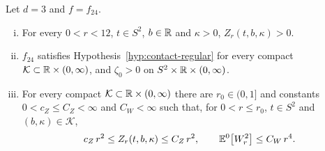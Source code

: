 \begin{lemma}\label{lem:contact-normalizer}
Let $d=3$ and $f=f_{24}$.
\begin{enumerate}[(i)]
\item For every $0<r<12$, $t\in S^2$, $b\in\mathbb R$ and $\kappa>0$, $Z_r(t,b,\kappa)>0$.
\item $f_{24}$ satisfies Hypothesis~\ref{hyp:contact-regular} for every compact $\mathcal K\subset\mathbb R\times(0,\infty)$, and $\zeta_0>0$ on $S^2\times\mathbb R\times(0,\infty)$.
\item For every compact $\mathcal K\subset\mathbb R\times(0,\infty)$ there are $r_0\in(0,1]$ and constants $0<c_Z\le C_Z<\infty$ and $C_W<\infty$ such that, for $0<r\le r_0$, $t\in S^2$ and $(b,\kappa)\in\mathcal K$,
\begin{equation}\label{eq:contact-normalizer}
c_Z\,r^2\le Z_r(t,b,\kappa)\le C_Z\,r^2,\qquad\mathbb E^0\bigl[W_r^2\bigr]\le C_W\,r^4 .
\end{equation}
\end{enumerate}
\end{lemma}

